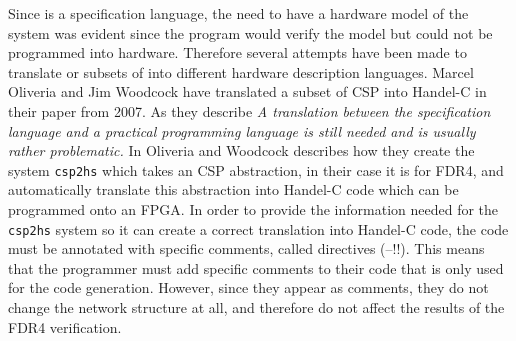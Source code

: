 Since \cspm is a specification language, the need to have a hardware model of the system was evident since the \cspm program would verify the model but could not be programmed into hardware. Therefore several attempts have been made to translate \cspm or subsets of \cspm into different hardware description languages. Marcel Oliveria and Jim Woodcock have translated a subset of CSP into Handel-C\cite{Celoxia2002} in their paper from 2007\cite{Oliveira2007}. As they describe \textit{A translation between the specification language and a practical programming language is still needed and is usually rather problematic.}
In \cite{Oliveira2007} Oliveria and Woodcock describes how they create the system \texttt{csp2hs} which takes an CSP abstraction, in their case it is \cspm for FDR4, and automatically translate this abstraction into Handel-C code which can be programmed onto an FPGA.
In order to provide the information needed for the \texttt{csp2hs} system so it can create a correct translation into Handel-C code, the \cspm code must be annotated with specific \cspm comments, called directives (--!!).
This means that the programmer must add specific comments to their \cspm code that is only used for the code generation. However, since they appear as \cspm comments, they do not change the network structure at all, and therefore do not affect the results of the FDR4 verification.

